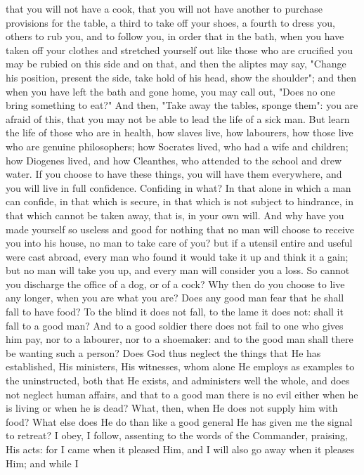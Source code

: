 \documentclass[a4paper]{article}
\begin{document}
that you will not have a cook, that you will not have another to purchase
provisions for the table, a third to take off your shoes, a fourth to dress
you, others to rub you, and to follow you, in order that in the bath, when you
have taken off your clothes and stretched yourself out like those who are
crucified you may be rubied on this side and on that, and then the aliptes may
say, "Change his position, present the side, take hold of his head, show the
shoulder"; and then when you have left the bath and gone home, you may call
out, "Does no one bring something to eat?" And then, "Take away the tables,
sponge them": you are afraid of this, that you may not be able to lead the life
of a sick man. But learn the life of those who are in health, how slaves live,
how labourers, how those live who are genuine philosophers; how Socrates lived,
who had a wife and children; how Diogenes lived, and how Cleanthes, who
attended to the school and drew water. If you choose to have these things, you
will have them everywhere, and you will live in full confidence. Confiding in
what? In that alone in which a man can confide, in that which is secure, in
that which is not subject to hindrance, in that which cannot be taken away,
that is, in your own will. And why have you made yourself so useless and good
for nothing that no man will choose to receive you into his house, no man to
take care of you? but if a utensil entire and useful were cast abroad, every
man who found it would take it up and think it a gain; but no man will take you
up, and every man will consider you a loss. So cannot you discharge the office
of a dog, or of a cock? Why then do you choose to live any longer, when you are
what you are?
    Does any good man fear that he shall fall to have food? To the blind it
does not fall, to the lame it does not: shall it fall to a good man? And to a
good soldier there does not fail to one who gives him pay, nor to a labourer,
nor to a shoemaker: and to the good man shall there be wanting such a person?
Does God thus neglect the things that He has established, His ministers, His
witnesses, whom alone He employs as examples to the uninstructed, both that He
exists, and administers well the whole, and does not neglect human affairs, and
that to a good man there is no evil either when he is living or when he is
dead? What, then, when He does not supply him with food? What else does He do
than like a good general He has given me the signal to retreat? I obey, I
follow, assenting to the words of the Commander, praising, His acts: for I came
when it pleased Him, and I will also go away when it pleases Him; and while I
\end{document}
